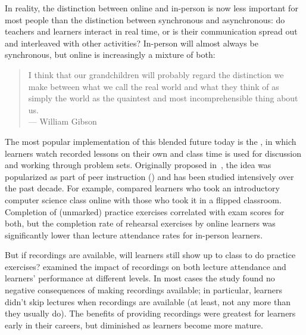 In reality,
the distinction between online and in-person is now less important for most people
than the distinction between synchronous and asynchronous:
do teachers and learners interact in real time,
or is their communication spread out and interleaved with other activities?
In-person will almost always be synchronous,
but online is increasingly a mixture of both:

\begin{quote}

  I think that our grandchildren will probably regard the distinction we make
  between what we call the real world and what they think of as simply the world
  as the quaintest and most incomprehensible thing about us. \\
  --- William Gibson

\end{quote}

The most popular implementation of this blended future today
is the ,
in which learners watch recorded lessons on their own
and class time is used for discussion and working through problem sets.
Originally proposed in~\cite{King1993},
the idea was popularized as part of peer instruction ()
and has been studied intensively over the past decade.
For example,
\cite{Camp2016} compared learners who took an introductory computer science class online
with those who took it in a flipped classroom.
Completion of (unmarked) practice exercises correlated with exam scores for both,
but the completion rate of rehearsal exercises by online learners
was significantly lower than lecture attendance rates for in-person learners.

But if recordings are available,
will learners still show up to class to do practice exercises?
\cite{Nord2017} examined the impact of recordings on both lecture attendance
and learners' performance at different levels.
In most cases the study found no negative consequences of making recordings available;
in particular,
learners didn't skip lectures when recordings are available
(at least, not any more than they usually do).
The benefits of providing recordings were greatest for learners early in their careers,
but diminished as learners become more mature.

